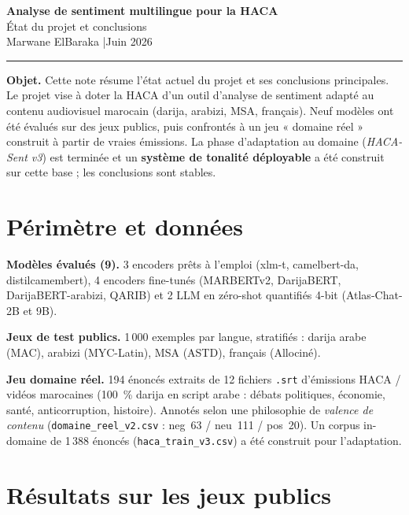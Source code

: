 \documentclass[11pt, a4paper]{article}
\begin{document}
\begin{center}
  {\Large\bfseries\color{hacablue} Analyse de sentiment multilingue pour la HACA}\\[3pt]
  {\large État du projet et conclusions}\\[5pt]
  {\normalsize Marwane ElBaraka \quad|\quad Juin 2026}
\end{center}

\vspace{2pt}\rule{\linewidth}{0.8pt}\vspace{6pt}

\textbf{Objet.} Cette note résume l'état actuel du projet et ses conclusions
principales. Le projet vise à doter la HACA d'un outil d'analyse de sentiment
adapté au contenu audiovisuel marocain (darija, arabizi, MSA, français). Neuf
modèles ont été évalués sur des jeux publics, puis confrontés à un jeu
« domaine réel » construit à partir de vraies émissions. La phase d'adaptation
au domaine (\emph{HACA-Sent v3}) est terminée et un \textbf{système de tonalité
déployable} a été construit sur cette base ; les conclusions sont stables.

\section{Périmètre et données}

\textbf{Modèles évalués (9).} 3 encoders prêts à l'emploi (xlm-t,
camelbert-da, distilcamembert), 4 encoders fine-tunés (MARBERTv2, DarijaBERT,
DarijaBERT-arabizi, QARIB) et 2 LLM en zéro-shot quantifiés 4-bit
(Atlas-Chat-2B et 9B).

\textbf{Jeux de test publics.} 1\,000 exemples par langue, stratifiés :
darija arabe (MAC), arabizi (MYC-Latin), MSA (ASTD), français (Allociné).

\textbf{Jeu domaine réel.} 194 énoncés extraits de 12 fichiers \texttt{.srt}
d'émissions HACA / vidéos marocaines (100~\% darija en script arabe : débats
politiques, économie, santé, anticorruption, histoire). Annotés selon une
philosophie de \emph{valence de contenu} (\texttt{domaine\_reel\_v2.csv} :
neg~63 / neu~111 / pos~20). Un corpus in-domaine de 1\,388 énoncés
(\texttt{haca\_train\_v3.csv}) a été construit pour l'adaptation.

\section{Résultats sur les jeux publics}
\end{document}

